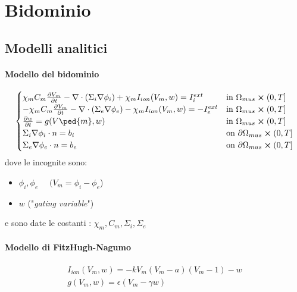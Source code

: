 \documentclass[a4paper]{article}
\theoremstyle{definition}
\begin{document}
\newpage

\section{Bidominio}
\vspace{5mm}
\subsection{Modelli analitici}
\vspace{5mm}
\paragraph{Modello del bidominio}
\begin{equation}
\begin{cases}
\chi_m C_m\pdv{V_m}{t} - \nabla \cdot (\Sigma_i \nabla \phi_i) + \chi_m I_{ion}(V_m,w) = I_i^{ext}    & \text{in } \Omega_{mus} \cross (0,T]
\\
-\chi_m C_m\pdv{V_m}{t} - \nabla \cdot (\Sigma_e \nabla \phi_e) - \chi_m I_{ion}(V_m,w) = -I_e^{ext}    & \text{in } \Omega_{mus} \cross (0,T]
\\
\pdv{w}{t} = g(V\ped{m}, w)  & \text{in } \Omega_{mus} \cross (0,T]
\\
\Sigma_i\nabla \phi_i \cdot n = b_i   & \text{on } \partial \Omega_{mus} \cross (0,T]
\\
\Sigma_e\nabla \phi_e \cdot n = b_e   & \text{on } \partial \Omega_{mus} \cross (0,T]
\end{cases}
\end{equation}
\vspace{4mm}\newline
dove le incognite sono:
\begin{itemize}
	\item $\phi_i, \phi_e$  $\quad (V_m = \phi_i-\phi_e$)
	\item $w$  ("\emph{gating variable}")
\end{itemize}
e sono date le costanti : $\chi_m, C_m, \Sigma_i, \Sigma_e$

\paragraph{Modello di FitzHugh-Nagumo}
\begin{equation}
\begin{gathered}
I_{ion}(V_m, w) = -kV_m(V_m-a)(V_m-1) -w
\\
g(V_m,w) = \epsilon(V_m -\gamma w)
\end{gathered}
\end{equation}
\end{document}
